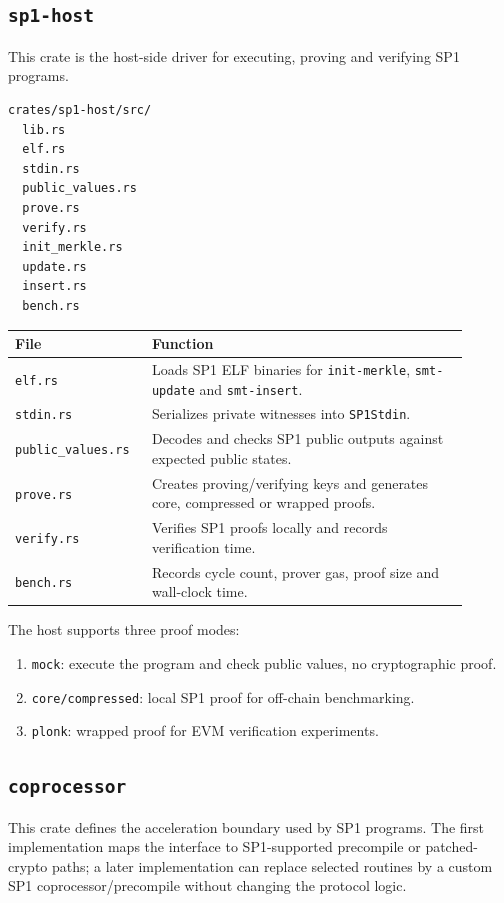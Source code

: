 \documentclass[UTF8,a4paper,11pt]{ctexart}
\begin{document}
\subsection{\texttt{sp1-host}}

This crate is the host-side driver for executing, proving and verifying SP1 programs.

\begin{lstlisting}
crates/sp1-host/src/
  lib.rs
  elf.rs
  stdin.rs
  public_values.rs
  prove.rs
  verify.rs
  init_merkle.rs
  update.rs
  insert.rs
  bench.rs
\end{lstlisting}

\begin{longtable}{p{0.25\linewidth}p{0.65\linewidth}}
\toprule
File & Function \\
\midrule
\texttt{elf.rs} & Loads SP1 ELF binaries for \texttt{init-merkle}, \texttt{smt-update} and \texttt{smt-insert}. \\
\texttt{stdin.rs} & Serializes private witnesses into \texttt{SP1Stdin}. \\
\texttt{public\_values.rs} & Decodes and checks SP1 public outputs against expected public states. \\
\texttt{prove.rs} & Creates proving/verifying keys and generates core, compressed or wrapped proofs. \\
\texttt{verify.rs} & Verifies SP1 proofs locally and records verification time. \\
\texttt{bench.rs} & Records cycle count, prover gas, proof size and wall-clock time. \\
\bottomrule
\end{longtable}

The host supports three proof modes:
\begin{enumerate}[leftmargin=2em]
  \item \texttt{mock}: execute the program and check public values, no cryptographic proof.
  \item \texttt{core/compressed}: local SP1 proof for off-chain benchmarking.
  \item \texttt{plonk}: wrapped proof for EVM verification experiments.
\end{enumerate}

\subsection{\texttt{coprocessor}}

This crate defines the acceleration boundary used by SP1 programs. The first implementation maps the interface to SP1-supported precompile or patched-crypto paths; a later implementation can replace selected routines by a custom SP1 coprocessor/precompile without changing the protocol logic.
\end{document}
